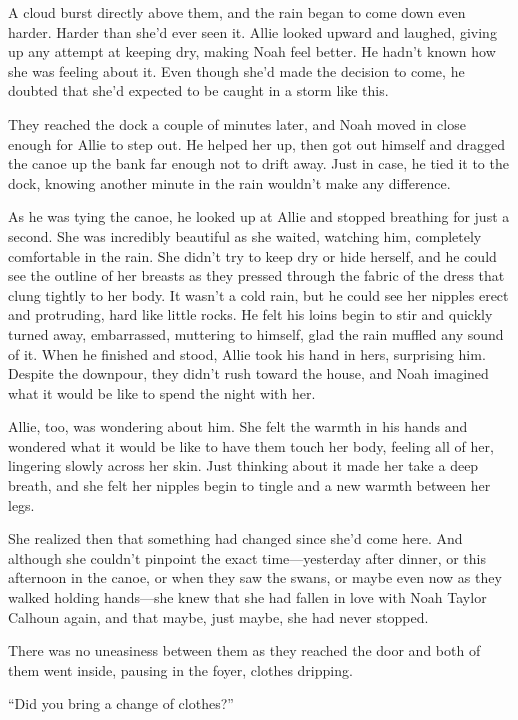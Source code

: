 \documentclass[10pt, twoside, openright]{book}
\begin{document}
A cloud burst directly above them, and the rain began to come down even
harder. Harder than she'd ever seen it. Allie looked upward and laughed,
giving up any attempt at keeping dry, making Noah feel better. He hadn't
known how she was feeling about it. Even though she'd made the decision
to come, he doubted that she'd expected to be caught in a storm like
this.

They reached the dock a couple of minutes later, and Noah moved in close
enough for Allie to step out. He helped her up, then got out himself and
dragged the canoe up the bank far enough not to drift away. Just in
case, he tied it to the dock, knowing another minute in the rain
wouldn't make any difference.

As he was tying the canoe, he looked up at Allie and stopped breathing
for just a second. She was incredibly beautiful as she waited, watching
him, completely comfortable in the rain. She didn't try to keep dry or
hide herself, and he could see the outline of her breasts as they
pressed through the fabric of the dress that clung tightly to her body.
It wasn't a cold rain, but he could see her nipples erect and
protruding, hard like little rocks. He felt his loins begin to stir and
quickly turned away, embarrassed, muttering to himself, glad the rain
muffled any sound of it. When he finished and stood, Allie took his hand
in hers, surprising him. Despite the downpour, they didn't rush toward
the house, and Noah imagined what it would be like to spend the night
with her.

Allie, too, was wondering about him. She felt the warmth in his hands
and wondered what it would be like to have them touch her body, feeling
all of her, lingering slowly across her skin. Just thinking about it
made her take a deep breath, and she felt her nipples begin to tingle
and a new warmth between her legs.

She realized then that something had changed since she'd come here. And
although she couldn't pinpoint the exact time---yesterday after dinner,
or this afternoon in the canoe, or when they saw the swans, or maybe
even now as they walked holding hands---she knew that she had fallen in
love with Noah Taylor Calhoun again, and that maybe, just maybe, she had
never stopped.

There was no uneasiness between them as they reached the door and both
of them went inside, pausing in the foyer, clothes dripping.


``Did you bring a change of clothes?''
\end{document}
